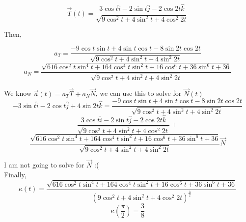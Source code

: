 \documentclass{article}
\begin{document}
\[
\vec{T}(t) = \frac{3 \cos t \hat{i} -2 \sin t \hat{j} - 2\cos 2t \hat{k}}{\sqrt{9 \cos^2 t + 4 \sin^2 t + 4 \cos^2 2t }}
\]


Then,

\[
a_T = \frac{-9\cos t \sin t  + 4\sin t \cos t - 8\sin 2t \cos 2t}{\sqrt{9 \cos^2 t + 4 \sin^2 t + 4 \sin^2 2t }}
\]
\[
a_N = \frac{\sqrt{616 \cos^2t\sin^4t + 164\cos^4t\sin^2 t + 16\cos^6t + 36\sin^6t + 36}}{\sqrt{9 \cos^2 t + 4 \sin^2 t + 4 \sin^2 2t }}
\]

We know \(\vec{a}(t) = a_T \vec{T} + a_N \vec{N}\), we can use this to solve for \(\vec{N}(t)\)
\[
-3 \sin t \hat{i} - 2 \cos t \hat{j} + 4 \sin 2t \hat{k} = \frac{-9\cos t \sin t + 4\sin t \cos t- 8\sin 2t \cos 2t}{\sqrt{9 \cos^2 t + 4 \sin^2 t + 4 \sin^2 2t }}
\]
\[
\frac{3 \cos t \hat{i} -2 \sin t \hat{j} - 2\cos 2t \hat{k}}{\sqrt{9 \cos^2 t + 4 \sin^2 t + 4 \cos^2 2t }}
+ 
\]
\[
\frac{\sqrt{616 \cos^2t\sin^4t + 164\cos^4t\sin^2 t + 16\cos^6t + 36\sin^6t + 36}}{\sqrt{9 \cos^2 t + 4 \sin^2 t + 4 \sin^2 2t }} \vec{N}
\]

I am not going to solve for  \(\vec{N}\) :( 
\\

Finally,
\[
\kappa(t) = \frac{\sqrt{616 \cos^2t\sin^4t + 164\cos^4t\sin^2 t + 16\cos^6t + 36\sin^6t + 36}}{(9 \cos^2 t + 4 \sin^2 t + 4 \cos^2 2t)^{\frac{3}{2}}}
\]
\[
\kappa(\frac{\pi}{2}) = \frac{3}{8}
\]
\end{document}
